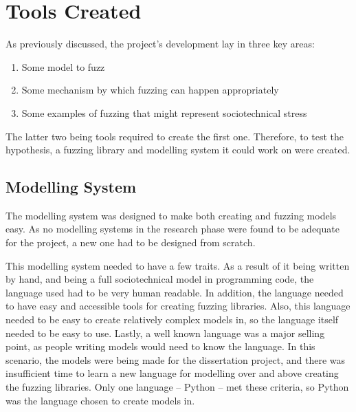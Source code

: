 \chapter{Tools Created}
\label{implementation_head}
As previously discussed, the project's development lay in three key areas: 
\begin{enumerate}
    \item Some model to fuzz
    \item Some mechanism by which fuzzing can happen appropriately
    \item Some examples of fuzzing that might represent sociotechnical stress
\end{enumerate}\par

The latter two being tools required to create the first one. Therefore, to test the hypothesis, a fuzzing library and modelling system it could work on were created. 

\section{Modelling System}
\label{model_outline}
The modelling system was designed to make both creating and fuzzing models easy. As no modelling systems in the research phase were found to be adequate for the project, a new one had to be designed from scratch.\par
This modelling system needed to have a few traits. As a result of it being written by hand, and being a full sociotechnical model in programming code, the language used had to be very human readable. In addition, the language needed to have easy and accessible tools for creating fuzzing libraries. Also, this language needed to be easy to create relatively complex models in, so the language itself needed to be easy to use. Lastly, a well known language was a major selling point, as people writing models would need to know the language. In this scenario, the models were being made for the dissertation project, and there was insufficient time to learn a new language for modelling over and above creating the fuzzing libraries. Only one language -- Python -- met these criteria, so Python was the language chosen to create models in. \par%

